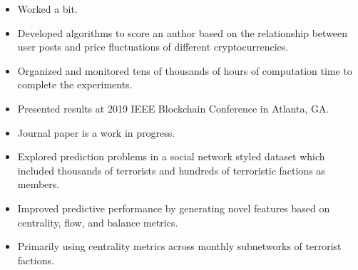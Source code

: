 \documentclass[11pt]{resume}
\begin{document}
    \begin{itemize}
        \item Worked a bit.
    \end{itemize}


    
    \begin{itemize}
        \item Developed algorithms to score an author based on the relationship between user posts and price fluctuations of different cryptocurrencies.
        \item Organized and monitored tens of thousands of hours of computation time to complete the experiments.
        \item Presented results at 2019 IEEE Blockchain Conference in Atlanta, GA.
            \item Journal paper is a work in progress. 
    \end{itemize}

    \divider


    \begin{itemize}
        \item Explored prediction problems in a social network styled dataset which included thousands of terrorists and hundreds of 
            terroristic factions as members.
        \item Improved predictive performance by generating novel features based on centrality, flow, and balance metrics.
            \item Primarily using centrality metrics across monthly subnetworks of terrorist factions.
    \end{itemize}

    \divider
\end{document}

